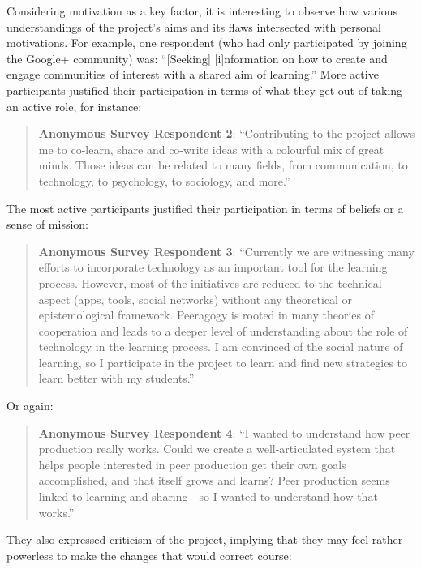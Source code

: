 Considering motivation as a key factor, it is interesting to observe how
various understandings of the project's aims and its flaws intersected
with personal motivations. For example, one respondent (who had only
participated by joining the Google+ community) was: ``{{[}Seeking{]}}
{{[}i{]}}nformation on how to create and engage communities of interest
with a shared aim of learning.'' More active participants justified
their participation in terms of what they get out of taking an active
role, for instance:

\begin{quote}
\textbf{Anonymous Survey Respondent 2}: ``Contributing to the project
allows me to co-learn, share and co-write ideas with a colourful mix of
great minds. Those ideas can be related to many fields, from
communication, to technology, to psychology, to sociology, and more.''
\end{quote}

The most active participants justified their participation in terms of
beliefs or a sense of mission:

\begin{quote}
\textbf{Anonymous Survey Respondent 3}: ``Currently we are witnessing
many efforts to incorporate technology as an important tool for the
learning process. However, most of the initiatives are reduced to the
technical aspect (apps, tools, social networks) without any theoretical
or epistemological framework. Peeragogy is rooted in many theories of
cooperation and leads to a deeper level of understanding about the role
of technology in the learning process. I am convinced of the social
nature of learning, so I participate in the project to learn and find
new strategies to learn better with my students.''
\end{quote}

Or again:

\begin{quote}
\textbf{Anonymous Survey Respondent 4}: ``I wanted to understand how
peer production really works. Could we create a well-articulated system
that helps people interested in peer production get their own goals
accomplished, and that itself grows and learns? Peer production seems
linked to learning and sharing - so I wanted to understand how that
works.''
\end{quote}

They also expressed criticism of the project, implying that they may
feel rather powerless to make the changes that would correct course:

